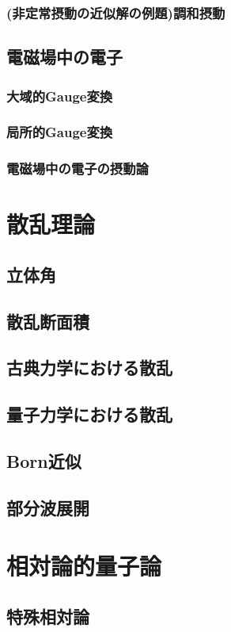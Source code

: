 \documentclass{report}
\begin{document}
      \subsection{(非定常摂動の近似解の例題)調和摂動}
        
    \section{電磁場中の電子}
      
      \subsection{大域的Gauge変換}
        
      \subsection{局所的Gauge変換}
        
      \subsection{電磁場中の電子の摂動論}
        
  \chapter{散乱理論}
    \section{立体角}
      
    \section{散乱断面積}
      
    \section{古典力学における散乱}
      
    \section{量子力学における散乱}
      
    \section{Born近似}
      
    \section{部分波展開}
      
  \chapter{相対論的量子論}
    \section{特殊相対論}
      
\end{document}
